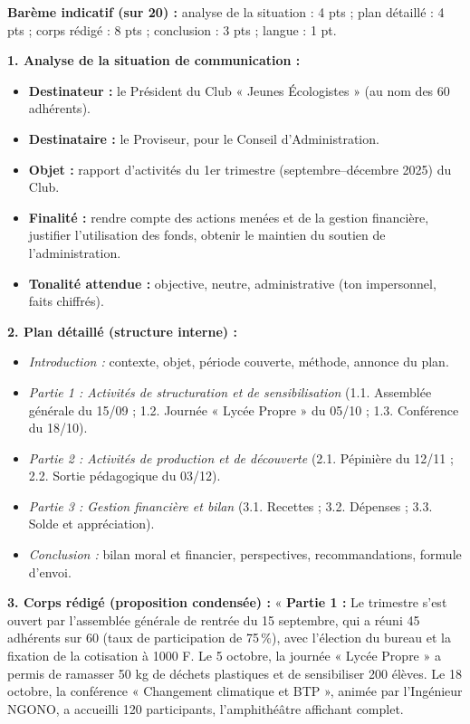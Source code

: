 \documentclass[11pt]{article}
\begin{document}
\begin{corrige}
\textbf{Barème indicatif (sur 20) :} analyse de la situation : 4 pts ; plan détaillé : 4 pts ; corps rédigé : 8 pts ; conclusion : 3 pts ; langue : 1 pt.

\textbf{1. Analyse de la situation de communication :}
\begin{itemize}
    \item \textbf{Destinateur :} le Président du Club « Jeunes Écologistes » (au nom des 60 adhérents).
    \item \textbf{Destinataire :} le Proviseur, pour le Conseil d'Administration.
    \item \textbf{Objet :} rapport d'activités du 1er trimestre (septembre--décembre 2025) du Club.
    \item \textbf{Finalité :} rendre compte des actions menées et de la gestion financière, justifier l'utilisation des fonds, obtenir le maintien du soutien de l'administration.
    \item \textbf{Tonalité attendue :} objective, neutre, administrative (ton impersonnel, faits chiffrés).
\end{itemize}
\textbf{2. Plan détaillé (structure interne) :}
\begin{itemize}
    \item \emph{Introduction :} contexte, objet, période couverte, méthode, annonce du plan.
    \item \emph{Partie 1 : Activités de structuration et de sensibilisation} (1.1. Assemblée générale du 15/09 ; 1.2. Journée « Lycée Propre » du 05/10 ; 1.3. Conférence du 18/10).
    \item \emph{Partie 2 : Activités de production et de découverte} (2.1. Pépinière du 12/11 ; 2.2. Sortie pédagogique du 03/12).
    \item \emph{Partie 3 : Gestion financière et bilan} (3.1. Recettes ; 3.2. Dépenses ; 3.3. Solde et appréciation).
    \item \emph{Conclusion :} bilan moral et financier, perspectives, recommandations, formule d'envoi.
\end{itemize}
\textbf{3. Corps rédigé (proposition condensée) :}
« \textbf{Partie 1 :} Le trimestre s'est ouvert par l'assemblée générale de rentrée du 15 septembre, qui a réuni 45 adhérents sur 60 (taux de participation de 75\,\%), avec l'élection du bureau et la fixation de la cotisation à 1000 F. Le 5 octobre, la journée « Lycée Propre » a permis de ramasser 50 kg de déchets plastiques et de sensibiliser 200 élèves. Le 18 octobre, la conférence « Changement climatique et BTP », animée par l'Ingénieur NGONO, a accueilli 120 participants, l'amphithéâtre affichant complet.

\end{corrige}
\end{document}
